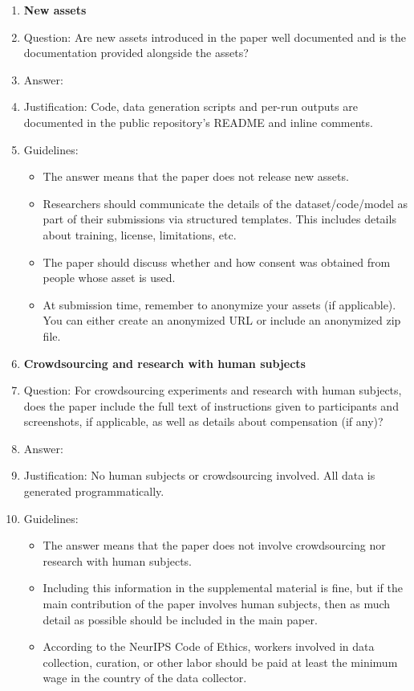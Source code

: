 \documentclass{article}
\begin{document}
\begin{enumerate}
\item {\bf New assets}
    \item[] Question: Are new assets introduced in the paper well documented and is the documentation provided alongside the assets?
    \item[] Answer: \answerYes{}
    \item[] Justification: Code, data generation scripts and per-run outputs are documented in the public repository's README and inline comments.
    \item[] Guidelines:
    \begin{itemize}
        \item The answer \answerNA{} means that the paper does not release new assets.
        \item Researchers should communicate the details of the dataset\slash code\slash model as part of their submissions via structured templates. This includes details about training, license, limitations, etc.
        \item The paper should discuss whether and how consent was obtained from people whose asset is used.
        \item At submission time, remember to anonymize your assets (if applicable). You can either create an anonymized URL or include an anonymized zip file.
    \end{itemize}

\item {\bf Crowdsourcing and research with human subjects}
    \item[] Question: For crowdsourcing experiments and research with human subjects, does the paper include the full text of instructions given to participants and screenshots, if applicable, as well as details about compensation (if any)?
    \item[] Answer: \answerNA{}
    \item[] Justification: No human subjects or crowdsourcing involved. All data is generated programmatically.
    \item[] Guidelines:
    \begin{itemize}
        \item The answer \answerNA{} means that the paper does not involve crowdsourcing nor research with human subjects.
        \item Including this information in the supplemental material is fine, but if the main contribution of the paper involves human subjects, then as much detail as possible should be included in the main paper.
        \item According to the NeurIPS Code of Ethics, workers involved in data collection, curation, or other labor should be paid at least the minimum wage in the country of the data collector.
    \end{itemize}


\end{enumerate}
\end{document}
